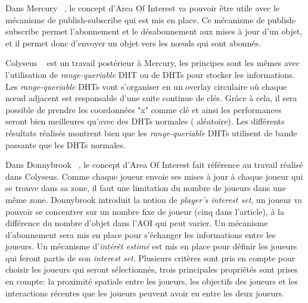 	\par Dans Mercury ~\cite{1015507}, le concept d'Area Of Interest va pouvoir être utile avec le mécanisme de publish-subscribe qui est mis en place. Ce mécanisme de publish-subscribe permet l'abonnement et le désabonnement aux mises à jour d'un objet, et il permet donc d'envoyer un objet vers les nœuds qui sont abonnés.\\
	\par Colyseus ~\cite{1267692} est un travail postérieur à Mercury, les principes sont les mêmes avec l'utilisation de \textit{range-queriable} DHT ou de DHTs pour stocker les informations. Les \textit{range-queriable} DHTs vont s'organiser en un overlay circulaire où chaque nœud adjacent est responsable d'une suite continue de clés. Grâce à cela, il sera possible de prendre les coordonnées "x" comme clé et ainsi les performances seront bien meilleures qu'avec des DHTs normales ( aléatoire). Les différents résultats réalisés montrent bien que les \textit{range-queriable} DHTs utilisent de bande passante que les DHTs normales. \\
	\par Dans Donnybrook ~\cite{1403002}, le concept d'Area Of Interest fait référence au travail réalisé dans Colyseus. Comme chaque joueur envoie ses mises à jour à chaque joueur qui se trouve dans sa zone, il faut une limitation du nombre de joueurs dans une même zone. Donnybrook introduit la notion de \textit{player's interest set}, un joueur va pouvoir se concentrer sur un nombre fixe de joueur (cinq dans l'article), à la différence du nombre d'objet dans l'AOI qui peut varier. Un mécanisme d'abonnement sera mis en place pour s'échanger les informations entre les joueurs. Un mécanisme d'\textit{intérêt estimé} est mis en place pour définir les joueurs qui feront partis de son \textit{interest set}. Plusieurs critères sont pris en compte pour choisir les joueurs qui seront sélectionnés, trois principales propriétés sont prises en compte: la proximité spatiale entre les joueurs, les objectifs des joueurs et les interactions récentes que les joueurs peuvent avoir eu entre les deux joueurs.\\
